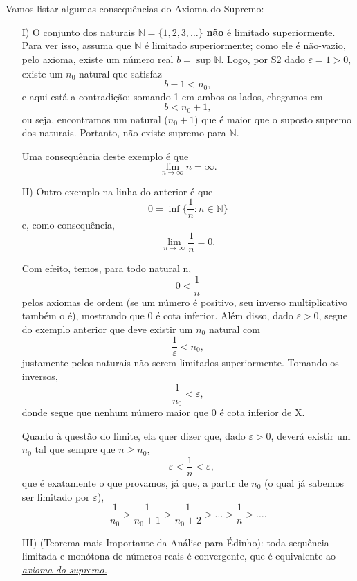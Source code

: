 \documentclass[../analysisII_notes.tex]{subfiles}
\begin{document}
Vamos listar algumas consequências do Axioma do Supremo:
\begin{itemize}
	\item[I)] O conjunto dos naturais \(\mathbb{N} = \{1, 2, 3, \dotsc \}\) \textbf{não} é limitado superiormente. Para ver isso, assuma que \(\mathbb{N}\) é limitado superiormente;
	      como ele é não-vazio, pelo axioma, existe um número real \(b = \sup_{}\mathbb{N}\). Logo, por S2 dado \(\varepsilon  = 1 > 0\), existe um \(n_{0}\) natural que satisfaz
	      \[
		      b-1 < n_{0},
	      \]
	      e aqui está a contradição: somando 1 em ambos os lados, chegamos em
	      \[
		      b < n_{0} + 1,
	      \]
	      ou seja, encontramos um natural (\(n_{0}+1\)) que é maior que o suposto supremo dos naturais. Portanto, não existe supremo para \(\mathbb{N}\).

	      Uma consequência deste exemplo é que
	      \[
		      \lim_{n\to \infty}n = \infty.
	      \]
	\item[II)] Outro exemplo na linha do anterior é que
	      \[
		      0 = \inf_{}\biggl\{\frac{1}{n}: n \in \mathbb{N}\biggr\}
	      \]
	      e, como consequência,
	      \[
		      \lim_{n\to \infty}\frac{1}{n} = 0.
	      \]

	      Com efeito, temos, para todo natural n,
	      \[
		      0 < \frac{1}{n}
	      \]
	      pelos axiomas de ordem (se um número é positivo, seu inverso multiplicativo também o é), mostrando que 0 é cota inferior. Além disso, dado \(\varepsilon > 0\), segue do exemplo anterior que deve existir um \(n_{0}\) natural com
	      \[
		      \frac{1}{\varepsilon } < n_{0},
	      \]
	      justamente pelos naturais não serem limitados superiormente. Tomando os inversos,
	      \[
		      \frac{1}{n_{0}} < \varepsilon,
	      \]
	      donde segue que nenhum número maior que 0 é cota inferior de X.

	      Quanto à questão do limite, ela quer dizer que, dado \(\varepsilon > 0\), deverá existir um \(n_{0}\) tal que sempre que \(n\geq n_{0}\),
	      \[
		      -\varepsilon < \frac{1}{n} <\varepsilon,
	      \]
	      que é exatamente o que provamos, já que, a partir de \(n_{0}\) (o qual já sabemos ser limitado por \(\varepsilon \)),
	      \[
		      \frac{1}{n_{0}} > \frac{1}{n_{0}+1} > \frac{1}{n_{0}+2} >\dotsc >\frac{1}{n} > \dotsc.
	      \]
	\item[III)] (Teorema mais Importante da Análise para Édinho): toda sequência limitada e monótona de números reais é convergente, que é equivalente ao \hyperlink{lub_property}{\textit{axioma do supremo.}}


\end{itemize}
\end{document}
